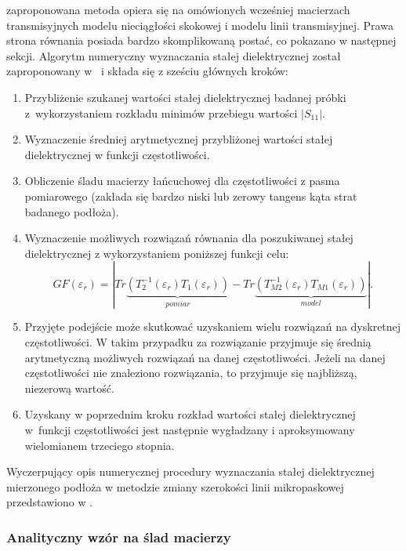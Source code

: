  \noindent zaproponowana metoda opiera się na omówionych wcześniej macierzach transmisyjnych modelu nieciągłości skokowej i modelu linii transmisyjnej. Prawa strona równania posiada bardzo skomplikowaną postać, co pokazano w następnej sekcji. 
Algorytm numeryczny wyznaczania stałej dielektrycznej został zaproponowany w~\cite{cite:line_width_method} i składa się z sześciu głównych kroków:
\begin{enumerate}
  \item Przybliżenie szukanej wartości stałej dielektrycznej badanej próbki z~wykorzystaniem rozkładu minimów przebiegu wartości $|S_{11}|$.
  \item Wyznaczenie średniej arytmetycznej przybliżonej wartości stałej dielektrycznej w funkcji częstotliwości.
  \item Obliczenie śladu macierzy łańcuchowej dla częstotliwości z pasma pomiarowego (zakłada się bardzo niski lub zerowy tangens kąta strat badanego podłoża).
   \item Wyznaczenie możliwych rozwiązań równania dla poszukiwanej stałej dielektrycznej z wykorzystaniem poniższej funkcji celu:
       \begin{equation}
    \label{line_width_goal_function_eq}
    GF(\varepsilon_r)=\left| Tr\underbrace{\left( T_2^{-1}\left(\varepsilon_r \right) T_1\left(\varepsilon_r \right) \right)}_{pomiar}-Tr\underbrace{\left(T_{M2}^{-1}\left(\varepsilon_r \right)T_{M1}\left(\varepsilon_r \right)\right)}_{model} \right| \text{.}
 \end{equation}
   \item Przyjęte podejście może skutkować uzyskaniem wielu rozwiązań na dyskretnej częstotliwości. W takim przypadku za rozwiązanie przyjmuje się średnią arytmetyczną możliwych rozwiązań na danej częstotliwości. Jeżeli na danej częstotliwości nie znaleziono rozwiązania, to przyjmuje się najbliższą, niezerową wartość.
   \item Uzyskany w poprzednim kroku rozkład wartości stałej dielektrycznej w~funkcji częstotliwości jest następnie wygładzany i aproksymowany wielomianem trzeciego stopnia.
 
\end{enumerate}

Wyczerpujący opis numerycznej procedury wyznaczania stałej dielektrycznej mierzonego podłoża w metodzie zmiany szerokości linii mikropaskowej przedstawiono w \cite{cite:doktorat}.

\subsubsection{Analityczny wzór na ślad macierzy}

